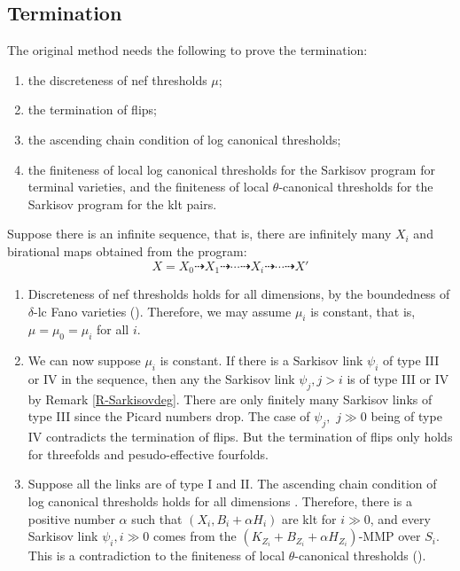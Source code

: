 \documentclass[11pt]{amsart}
\begin{document}
\subsection{Termination}\label{termination1}
The original method  needs the following to prove the termination:
\begin{enumerate}
  \item the discreteness of nef thresholds $\mu$;
  \item the termination of flips;
  \item the ascending chain condition of log canonical thresholds;
  \item the finiteness of local log canonical thresholds for the Sarkisov program for terminal varieties, and the finiteness of local $\theta$-canonical thresholds for the Sarkisov program for the klt pairs.
\end{enumerate}
Suppose there is an infinite sequence, that is,  there are infinitely many $ X_i $ and birational maps obtained from the program:
\[ X=X_0\dashrightarrow X_1\dashrightarrow \cdots\dashrightarrow X_i \dashrightarrow\cdots\dashrightarrow X'\]
\begin{enumerate}
  \item Discreteness of nef thresholds holds for all dimensions, by the boundedness of $\delta$-lc Fano varieties (\cite[Theorem 1.1]{birkarSingularitiesLinearSystems2020}). Therefore, we may assume $\mu_{i}$ is constant, that is, $\mu=\mu_{0}=\mu_{i}$ for all $i$.
  \item We can now suppose $\mu_i$ is constant. If there is a Sarkisov link $\psi_i$ of type III or IV in the sequence, then any the Sarkisov link $\psi_j, j>i$ is of type III or IV by Remark \ref{R-Sarkisovdeg}. There are only finitely many Sarkisov links of type III since the Picard numbers drop. The case of $\psi_j,$ $j\gg 0$ being of type IV contradicts the termination of flips. But the termination of flips only holds for threefolds and pesudo-effective fourfolds.
  \item Suppose all the links are of type I and II. The ascending chain condition of log canonical thresholds holds for all dimensions \cite{HMX14}. Therefore, there is a positive number $\alpha$ such that $(X_i,B_i+\alpha H_i)$ are klt for $i\gg 0$, and every Sarkisov link $\psi_i,i\gg 0$ comes from the $(K_{Z_i}+B_{Z_i}+\alpha H_{Z_i})$-MMP over $S_i$. This is a contradiction to  the finiteness of local $\theta$-canonical thresholds (\cite[Claim 2.2]{brunoLogSarkisovProgram1995}).
\end{enumerate}
\end{document}
